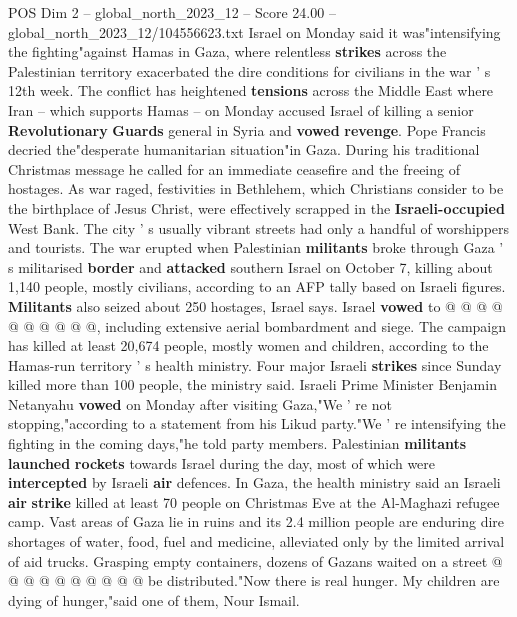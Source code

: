\begin{textsample}{POS Dim 2 – global\_north\_2023\_12 – Score 24.00 – global\_north\_2023\_12/104556623.txt}  \label{ex:f2_pos_234}
Israel on Monday said it was"intensifying the fighting"against Hamas in Gaza, where relentless \textbf{strikes} across the Palestinian territory exacerbated the dire conditions for civilians in the war ' s 12th week.
The conflict has heightened \textbf{tensions} across the Middle East where Iran -- which supports Hamas -- on Monday accused Israel of killing a senior \textbf{Revolutionary} \textbf{Guards} general in Syria and \textbf{vowed} \textbf{revenge}.
Pope Francis decried the"desperate humanitarian situation"in Gaza.
During his traditional Christmas message he called for an immediate ceasefire and the freeing of hostages.
As war raged, festivities in Bethlehem, which Christians consider to be the birthplace of Jesus Christ, were effectively scrapped in the \textbf{Israeli-occupied} West Bank.
The city ' s usually vibrant streets had only a handful of worshippers and tourists.
The war erupted when Palestinian \textbf{militants} broke through Gaza ' s militarised \textbf{border} and \textbf{attacked} southern Israel on October 7, killing about 1,140 people, mostly civilians, according to an AFP tally based on Israeli figures. \textbf{Militants} also seized about 250 hostages, Israel says.
Israel \textbf{vowed} to @ @ @ @ @ @ @ @ @ @, including extensive aerial bombardment and siege.
The campaign has killed at least 20,674 people, mostly women and children, according to the Hamas-run territory ' s health ministry.
Four major Israeli \textbf{strikes} since Sunday killed more than 100 people, the ministry said.
Israeli Prime Minister Benjamin Netanyahu \textbf{vowed} on Monday after visiting Gaza,"We ' re not stopping,"according to a statement from his Likud party."We ' re intensifying the fighting in the coming days,"he told party members.
Palestinian \textbf{militants} \textbf{launched} \textbf{rockets} towards Israel during the day, most of which were \textbf{intercepted} by Israeli \textbf{air} defences.
In Gaza, the health ministry said an Israeli \textbf{air} \textbf{strike} killed at least 70 people on Christmas Eve at the Al-Maghazi refugee camp.
Vast areas of Gaza lie in ruins and its 2.4 million people are enduring dire shortages of water, food, fuel and medicine, alleviated only by the limited arrival of aid trucks.
Grasping empty containers, dozens of Gazans waited on a street @ @ @ @ @ @ @ @ @ @ be distributed."Now there is real hunger.
My children are dying of hunger,"said one of them, Nour Ismail.

\end{textsample}
